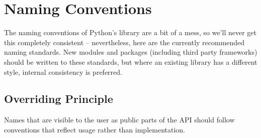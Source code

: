 \documentclass[a4paper,11pt]{article}
\begin{document}
\section{Naming Conventions}
The naming conventions of Python’s library are a bit of a mess, so we’ll 
never get this completely consistent – nevertheless, here are the currently 
recommended naming standards. New modules and packages (including third party 
frameworks) should be written to these standards, but where an existing 
library has a different style, internal consistency is preferred.
\par
\subsection{Overriding Principle}
Names that are visible to the user as public parts of the API should follow
conventions that reflect usage rather than implementation.
\par
\end{document}
